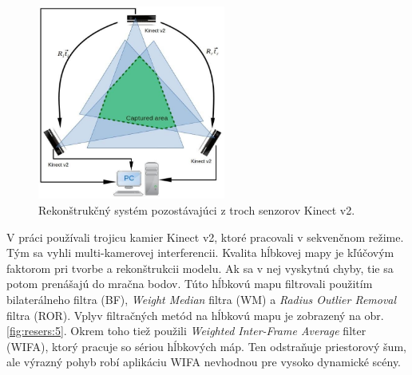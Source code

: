 \begin{figure}[h]
	\centering
	\includegraphics[width=0.55\textwidth]{figures/resers_m.png}
	\caption{Rekonštrukčný systém pozostávajúci z troch senzorov Kinect v2.}
	\label{fig:resers:m}
\end{figure}

V práci používali trojicu kamier Kinect v2, ktoré pracovali v sekvenčnom režime. Tým sa vyhli multi-kamerovej interferencii. Kvalita hĺbkovej mapy je kľúčovým faktorom pri tvorbe a rekonštrukcii modelu. Ak sa v nej vyskytnú chyby, tie sa potom prenášajú do mračna bodov. Túto hĺbkovú mapu filtrovali použitím bilaterálneho filtra (BF), \textit{Weight Median} filtra (WM) a \textit{Radius Outlier Removal} filtra (ROR). Vplyv filtračných metód na hĺbkovú mapu je zobrazený na obr. \ref{fig:resers:5}. Okrem toho tiež použili \textit{Weighted  Inter-Frame  Average} filter (WIFA), ktorý pracuje so sériou hĺbkových máp. Ten odstraňuje priestorový šum, ale výrazný pohyb robí aplikáciu WIFA nevhodnou pre vysoko dynamické scény.

